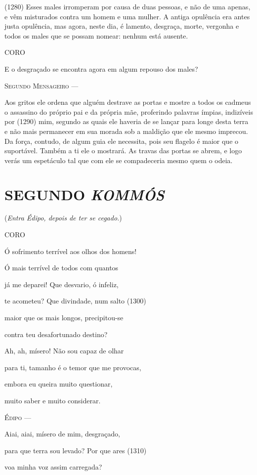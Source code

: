 (1280) Esses males irromperam por causa de duas pessoas, e não de uma
apenas, e vêm misturados contra um homem e uma mulher. A antiga
opulência era antes justa opulência, mas agora, neste dia, é lamento,
desgraça, morte, vergonha e todos os males que se possam nomear: nenhum
está ausente.

\textsc{CORO}

E o desgraçado se encontra agora em algum repouso dos males?

\textsc{Segundo Mensageiro} ---

Aos gritos ele ordena que alguém destrave as portas e mostre a todos os
cadmeus o assassino do próprio pai e da própria mãe, proferindo palavras
ímpias, indizíveis por (1290) mim, segundo as quais ele haveria de se
lançar para longe desta terra e não mais permanecer em sua morada sob a
maldição que ele mesmo imprecou. Da força, contudo, de algum guia ele
necessita, pois seu flagelo é maior que o suportável. Também a ti ele o
mostrará. As travas das portas se abrem, e logo verás um espetáculo tal
que com ele se compadeceria mesmo quem o odeia.

\section{SEGUNDO \emph{KOMMÓS}}

(\emph{Entra Édipo, depois de ter se cegado.})

\textsc{CORO}

Ó sofrimento terrível aos olhos dos homens!

Ó mais terrível de todos com quantos

já me deparei! Que desvario, ó infeliz,

te acometeu? Que divindade, num salto (1300)

maior que os mais longos, precipitou-se

contra teu desafortunado destino?

Ah, ah, mísero! Não sou capaz de olhar

para ti, tamanho é o temor que me provocas,

embora eu queira muito questionar,

muito saber e muito considerar.

\textsc{Édipo} ---

Aiai, aiai, mísero de mim, desgraçado,

para que terra sou levado? Por que ares (1310)

voa minha voz assim carregada?

